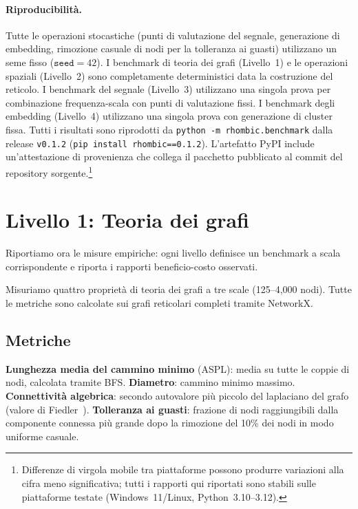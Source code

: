 \documentclass[11pt]{article}
\begin{document}
\paragraph{Riproducibilit\`a.}
Tutte le operazioni stocastiche (punti di valutazione del segnale,
generazione di embedding, rimozione casuale di nodi per la tolleranza ai
guasti) utilizzano un seme fisso ($\mathtt{seed}=42$). I benchmark di
teoria dei grafi (Livello~1) e le operazioni spaziali (Livello~2) sono
completamente deterministici data la costruzione del reticolo. I
benchmark del segnale (Livello~3) utilizzano una singola prova per
combinazione frequenza-scala con punti di valutazione fissi. I benchmark
degli embedding (Livello~4) utilizzano una singola prova con generazione
di cluster fissa. Tutti i risultati sono riprodotti da
\texttt{python~-m~rhombic.benchmark} dalla release \texttt{v0.1.2}
(\texttt{pip install rhombic==0.1.2}). L'artefatto PyPI include
un'attestazione di provenienza che collega il pacchetto pubblicato
al commit del repository sorgente.\footnote{Differenze di virgola mobile
tra piattaforme possono produrre variazioni alla cifra meno significativa;
tutti i rapporti qui riportati sono stabili sulle piattaforme testate
(Windows~11/Linux, Python~3.10--3.12).}

\section{Livello 1: Teoria dei grafi}
\label{sec:graph}

Riportiamo ora le misure empiriche: ogni livello definisce un benchmark
a scala corrispondente e riporta i rapporti beneficio-costo osservati.

Misuriamo quattro propriet\`a di teoria dei grafi a tre scale
(125--4{,}000 nodi). Tutte le metriche sono calcolate sui grafi
reticolari completi tramite NetworkX.

\subsection{Metriche}

\textbf{Lunghezza media del cammino minimo} (ASPL): media su tutte le
coppie di nodi, calcolata tramite BFS. \textbf{Diametro}: cammino minimo
massimo. \textbf{Connettivit\`a algebrica}: secondo autovalore pi\`u
piccolo del laplaciano del grafo (valore di
Fiedler~\cite{fiedler1973}). \textbf{Tolleranza ai guasti}: frazione di
nodi raggiungibili dalla componente connessa pi\`u grande dopo la
rimozione del 10\% dei nodi in modo uniforme casuale.
\end{document}
